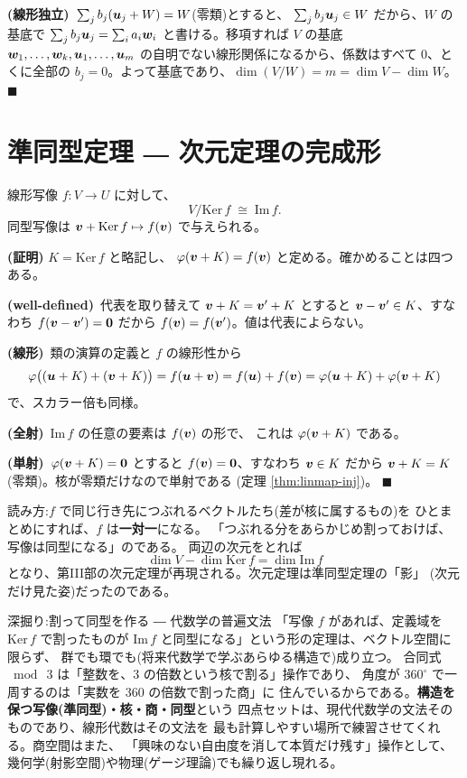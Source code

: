 \textbf{(線形独立)}\ $\sum_j b_j (\bm{u}_j + W) = W$(零類)とすると、
$\sum_j b_j \bm{u}_j \in W$ だから、$W$ の基底で
$\sum_j b_j \bm{u}_j = \sum_i a_i \bm{w}_i$ と書ける。移項すれば
$V$ の基底 $\bm{w}_1, \dots, \bm{w}_k, \bm{u}_1, \dots, \bm{u}_m$
の自明でない線形関係になるから、係数はすべて $0$、とくに全部の
$b_j = 0$。よって基底であり、$\dim(V/W) = m = \dim V - \dim W$。
$\blacksquare$

\section{準同型定理 ― 次元定理の完成形}

\begin{teiri}[準同型定理]\label{thm:quot-hom}
線形写像 $f : V \to U$ に対して、
\[
V/\mathrm{Ker}\,f \;\cong\; \mathrm{Im}\,f.
\]
同型写像は $\bm{v} + \mathrm{Ker}\,f \mapsto f(\bm{v})$ で与えられる。
\end{teiri}

\noindent\textbf{(証明)}\quad
$K = \mathrm{Ker}\,f$ と略記し、
$\varphi(\bm{v} + K) = f(\bm{v})$ と定める。確かめることは四つある。

\textbf{(well-defined)}\ 代表を取り替えて $\bm{v} + K = \bm{v}' + K$
とすると $\bm{v} - \bm{v}' \in K$、すなわち
$f(\bm{v} - \bm{v}') = \bm{0}$ だから
$f(\bm{v}) = f(\bm{v}')$。値は代表によらない。

\textbf{(線形)}\ 類の演算の定義と $f$ の線形性から
\[
\varphi\bigl((\bm{u} + K) + (\bm{v} + K)\bigr)
= f(\bm{u} + \bm{v}) = f(\bm{u}) + f(\bm{v})
= \varphi(\bm{u} + K) + \varphi(\bm{v} + K)
\]
で、スカラー倍も同様。

\textbf{(全射)}\ $\mathrm{Im}\,f$ の任意の要素は $f(\bm{v})$ の形で、
これは $\varphi(\bm{v} + K)$ である。

\textbf{(単射)}\ $\varphi(\bm{v} + K) = \bm{0}$ とすると
$f(\bm{v}) = \bm{0}$、すなわち $\bm{v} \in K$ だから
$\bm{v} + K = K$(零類)。核が零類だけなので単射である
(定理 \ref{thm:linmap-inj})。 $\blacksquare$

読み方:$f$ で同じ行き先につぶれるベクトルたち(差が核に属するもの)を
ひとまとめにすれば、$f$ は\textbf{一対一}になる。
「つぶれる分をあらかじめ割っておけば、写像は同型になる」のである。
両辺の次元をとれば
\[
\dim V - \dim \mathrm{Ker}\,f = \dim \mathrm{Im}\,f
\]
となり、第III部の次元定理が再現される。次元定理は準同型定理の「影」
(次元だけ見た姿)だったのである。

\begin{itembox}[l]{深掘り:割って同型を作る ― 代数学の普遍文法}
「写像 $f$ があれば、定義域を $\mathrm{Ker}\,f$ で割ったものが
$\mathrm{Im}\,f$ と同型になる」という形の定理は、ベクトル空間に限らず、
群でも環でも(将来代数学で学ぶあらゆる構造で)成り立つ。
合同式 $\bmod\ 3$ は「整数を、$3$ の倍数という核で割る」操作であり、
角度が $360^\circ$ で一周するのは「実数を $360$ の倍数で割った商」に
住んでいるからである。\textbf{構造を保つ写像(準同型)・核・商・同型}という
四点セットは、現代代数学の文法そのものであり、線形代数はその文法を
最も計算しやすい場所で練習させてくれる。商空間はまた、
「興味のない自由度を消して本質だけ残す」操作として、
幾何学(射影空間)や物理(ゲージ理論)でも繰り返し現れる。
\end{itembox}

